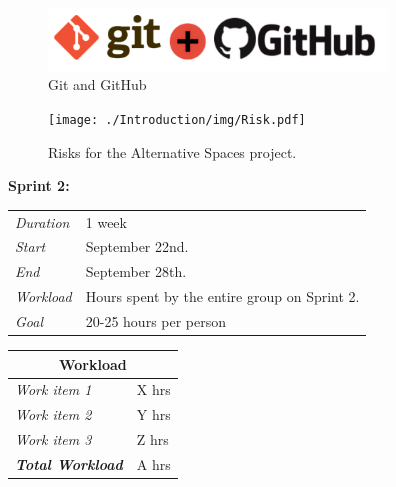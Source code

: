 \documentclass[11pt]{report}
\begin{document}

\begin{figure}[ht!]
\centering
\includegraphics[width=90mm]{./Sprint2/img/Sprint2-GitnGithub.png}
\caption{Git and GitHub \label{overflow}}
\end{figure}



\begin{figure}
	\texttt{[image: ./Introduction/img/Risk.pdf]}
    \caption{Risks for the Alternative Spaces project.}
    \label{fig:IntroRiskManRisks}
\end{figure}



\begin{minipage}{\linewidth}
\centering
\setlength{\tabcolsep}{22pt}
\textbf{Sprint 2:} 
\smallskip
{}
\begin{tabular}{ |l l| }
	\hline
	\it{Duration} & 1 week \\
	\it{Start} & September 22nd. \\
	\it{End} & September 28th. \\
	\it{Workload} & Hours spent by the entire group on Sprint 2. \\
	\it{Goal} & 20-25 hours per person \\
	\hline
\end{tabular}
\end{minipage}




\begin{minipage}{\linewidth}
\setlength{\tabcolsep}{15pt}
\centering
{}
\begin{tabular}{ |l|l| }
	\hline
	\multicolumn{2}{|c|}{\cellcolor{gray!25} Workload} \\
	\hline
	\it{Work item 1} & X hrs\\
	\it{Work item 2} & Y hrs\\
	\it{Work item 3} & Z hrs\\
	\hline
	\textbf{\textit{Total Workload}} & A hrs\\
	\hline
\end{tabular}
\end{minipage}
\end{document}
